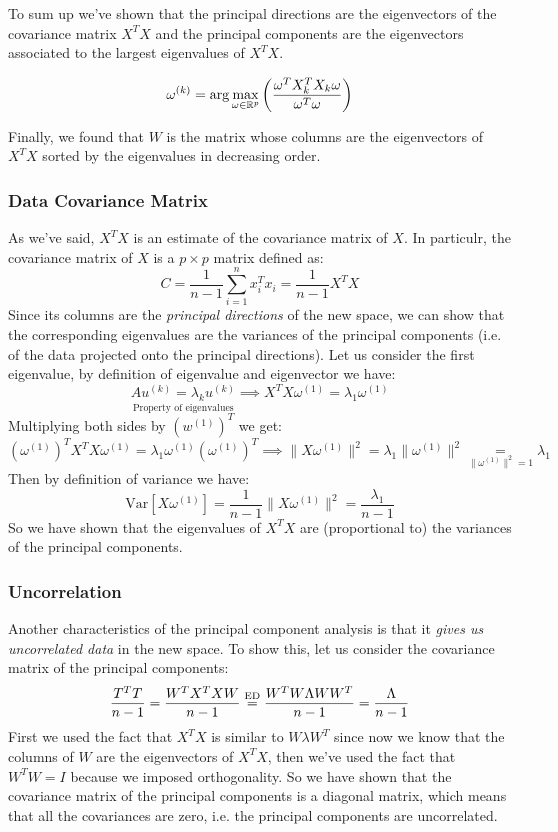 To sum up we've shown that the principal directions are the eigenvectors of the covariance matrix $X^T X$ and the principal components are the eigenvectors associated to the largest eigenvalues of $X^T X$. 

\[
    \omega^{(k)} = \arg \max_{\omega \in \mathbb{R}^p} \left(\frac{\omega^T X_k^T X_k \omega}{\omega^T \omega}\right)
\]

Finally, we found that $W$ is the matrix whose columns are the eigenvectors of $X^T X$ sorted by the eigenvalues in decreasing order.

\subsubsection*{Data Covariance Matrix}
As we've said, $X^TX$ is an estimate of the covariance matrix of $X$. In particulr, the covariance matrix of $X$ is a $p\times p$ matrix defined as:
\[
    C = \frac{1}{n-1} \sum_{i=1}^n x_i^T x_i = \frac{1}{n-1} X^T X
\]
Since its columns are the \textit{principal directions} of the new space, we can show that the corresponding eigenvalues are the variances of the principal components (i.e. of the data projected onto the principal directions).
Let us consider the first eigenvalue, by definition of eigenvalue and eigenvector we have:
\[
    \underset{\text{Property of eigenvalues}}{A u^{(k)} = \lambda_k u^{(k)}} \implies X^T X \omega^{(1)} = \lambda_1 \omega^{(1)}
\]
Multiplying both sides by $(w^{(1)})^T$ we get:
\[
    (\omega^{(1)})^T X^T X \omega^{(1)} = \lambda_1 \omega^{(1)}(\omega^{(1)})^T \implies \|X \omega^{(1)}\|^2 = \lambda_1 \|\omega^{(1)} \|^2 \underset{\|\omega^{(1)}\|^2=1}= \lambda_1
\]
Then by definition of variance we have:
\[
    \text{Var}\left[X \omega^{(1)}\right] = \frac{1}{n-1} \|X \omega^{(1)}\|^2 = \frac{\lambda_1}{n-1}
\]
So we have shown that the eigenvalues of $X^T X$ are (proportional to) the variances of the principal components.

\subsubsection*{Uncorrelation}
Another characteristics of the principal component analysis is that it \textit{gives us uncorrelated data} in the new space. To show this, let us consider the covariance matrix of the principal components:
\[
    \frac{T^T T}{n-1} = \frac{W^T X^T X W}{n-1} \overset{\tiny\text{ED}}= \frac{W^T W \Lambda W W^T}{n-1} = \frac{\Lambda}{n-1}
\]
First we used the fact that $X^T X$ is similar to $W \lambda W^T$ since now we know that the columns of $W$ are the eigenvectors of $X^TX$, then we've used the fact that $W^T W = I$ because we imposed orthogonality.
So we have shown that the covariance matrix of the principal components is a diagonal matrix, which means that all the covariances are zero, i.e. the principal components are uncorrelated.

